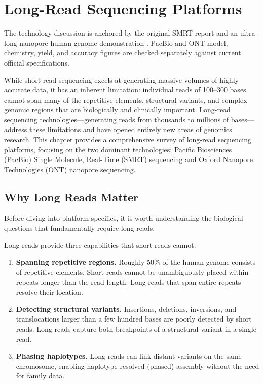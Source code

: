 \chapter{Long-Read Sequencing Platforms}
\label{ch:longread}

\begin{sourcebox}
The technology discussion is anchored by the original SMRT report and an ultra-long nanopore human-genome demonstration \cite{eid2009,jain2018}. PacBio and ONT model, chemistry, yield, and accuracy figures are checked separately against current official specifications.
\end{sourcebox}

While short-read sequencing excels at generating massive volumes of highly accurate data, it has an inherent limitation: individual reads of 100--300 bases cannot span many of the repetitive elements, structural variants, and complex genomic regions that are biologically and clinically important. Long-read sequencing technologies---generating reads from thousands to millions of bases---address these limitations and have opened entirely new areas of genomics research. This chapter provides a comprehensive survey of long-read sequencing platforms, focusing on the two dominant technologies: Pacific Biosciences (PacBio) Single Molecule, Real-Time (SMRT) sequencing and Oxford Nanopore Technologies (ONT) nanopore sequencing.

\section{Why Long Reads Matter}
\label{sec:why_long_reads}

Before diving into platform specifics, it is worth understanding the biological questions that fundamentally require long reads.

\begin{keyconcept}[title={The Long-Read Advantage}]
Long reads provide three capabilities that short reads cannot:
\begin{enumerate}[nosep]
  \item \textbf{Spanning repetitive regions.} Roughly 50\% of the human genome consists of repetitive elements. Short reads cannot be unambiguously placed within repeats longer than the read length. Long reads that span entire repeats resolve their location.
  \item \textbf{Detecting structural variants.} Insertions, deletions, inversions, and translocations larger than a few hundred bases are poorly detected by short reads. Long reads capture both breakpoints of a structural variant in a single read.
  \item \textbf{Phasing haplotypes.} Long reads can link distant variants on the same chromosome, enabling haplotype-resolved (phased) assembly without the need for family data.
\end{enumerate}
\end{keyconcept}

